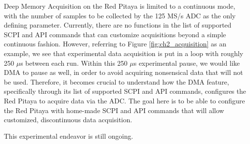 Deep Memory Acquisition on the Red Pitaya is limited to a continuous mode, with the number of samples to be collected by the 125 MS/s ADC as the only defining parameter. Currently, there are no functions in the list of supported SCPI and API commands that can customize acquisitions beyond a simple continuous fashion. However, referring to Figure \ref{fig:ch2_acquisition} as an example, we see that experimental data acquisition is put in a loop with roughly 250 $\mu$s between each run. Within this  250 $\mu$s experimental pause, we would like DMA to pause as well, in order to avoid acquiring nonsensical data that will not be used. Therefore, it becomes crucial to understand how the DMA feature, specifically through its list of supported SCPI and API commands, configures the Red Pitaya to acquire data via the ADC. The goal here is to be able to configure the Red Pitaya with home-made SCPI and API commands that will allow customized, discontinuous data acquisition.

This experimental endeavor is still ongoing.